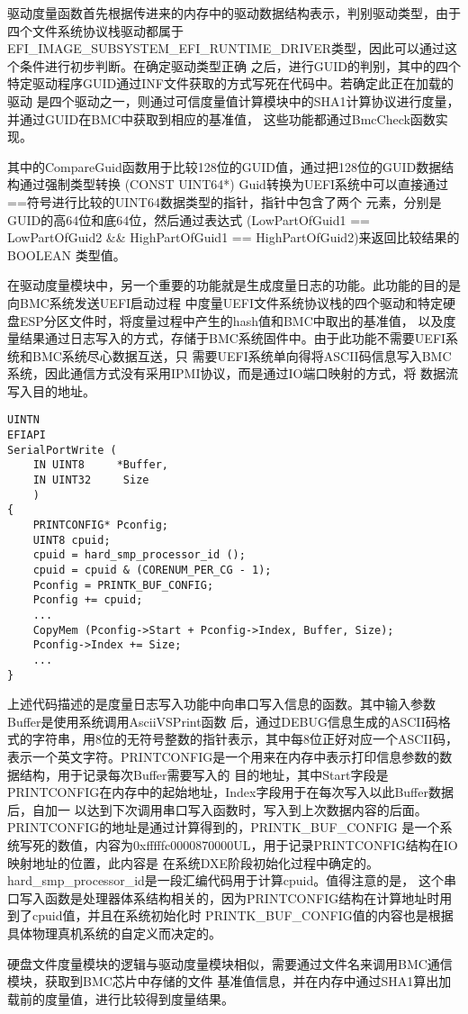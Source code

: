 驱动度量函数首先根据传进来的内存中的驱动数据结构表示，判别驱动类型，由于四个文件系统协议栈驱动都属于
EFI\_IMAGE\_SUBSYSTEM\_EFI\_RUNTIME\_DRIVER类型，因此可以通过这个条件进行初步判断。在确定驱动类型正确
之后，进行GUID的判别，其中的四个特定驱动程序GUID通过INF文件获取的方式写死在代码中。若确定此正在加载的驱动
是四个驱动之一，则通过可信度量值计算模块中的SHA1计算协议进行度量，并通过GUID在BMC中获取到相应的基准值，
这些功能都通过BmcCheck函数实现。
\par 其中的CompareGuid函数用于比较128位的GUID值，通过把128位的GUID数据结构通过强制类型转换
(CONST UINT64*) Guid转换为UEFI系统中可以直接通过==符号进行比较的UINT64数据类型的指针，指针中包含了两个
元素，分别是GUID的高64位和底64位，然后通过表达式
(LowPartOfGuid1 == LowPartOfGuid2 \&\& HighPartOfGuid1 == HighPartOfGuid2)来返回比较结果的BOOLEAN
类型值。
\par 在驱动度量模块中，另一个重要的功能就是生成度量日志的功能。此功能的目的是向BMC系统发送UEFI启动过程
中度量UEFI文件系统协议栈的四个驱动和特定硬盘ESP分区文件时，将度量过程中产生的hash值和BMC中取出的基准值，
以及度量结果通过日志写入的方式，存储于BMC系统固件中。由于此功能不需要UEFI系统和BMC系统尽心数据互送，只
需要UEFI系统单向得将ASCII码信息写入BMC系统，因此通信方式没有采用IPMI协议，而是通过IO端口映射的方式，将
数据流写入目的地址。

\begin{lstlisting}
UINTN
EFIAPI
SerialPortWrite (
    IN UINT8     *Buffer,
    IN UINT32     Size
    )
{
    PRINTCONFIG* Pconfig;
    UINT8 cpuid;
    cpuid = hard_smp_processor_id ();
    cpuid = cpuid & (CORENUM_PER_CG - 1);
    Pconfig = PRINTK_BUF_CONFIG;
    Pconfig += cpuid;
    ...
    CopyMem (Pconfig->Start + Pconfig->Index, Buffer, Size);
    Pconfig->Index += Size;
    ...
}
\end{lstlisting}
上述代码描述的是度量日志写入功能中向串口写入信息的函数。其中输入参数Buffer是使用系统调用AsciiVSPrint函数
后，通过DEBUG信息生成的ASCII码格式的字符串，用8位的无符号整数的指针表示，其中每8位正好对应一个ASCII码，
表示一个英文字符。PRINTCONFIG是一个用来在内存中表示打印信息参数的数据结构，用于记录每次Buffer需要写入的
目的地址，其中Start字段是PRINTCONFIG在内存中的起始地址，Index字段用于在每次写入以此Buffer数据后，自加一
以达到下次调用串口写入函数时，写入到上次数据内容的后面。PRINTCONFIG的地址是通过计算得到的，PRINTK\_BUF\_CONFIG
是一个系统写死的数值，内容为0xfffffc0000870000UL，用于记录PRINTCONFIG结构在IO映射地址的位置，此内容是
在系统DXE阶段初始化过程中确定的。hard\_smp\_processor\_id是一段汇编代码用于计算cpuid。值得注意的是，
这个串口写入函数是处理器体系结构相关的，因为PRINTCONFIG结构在计算地址时用到了cpuid值，并且在系统初始化时
PRINTK\_BUF\_CONFIG值的内容也是根据具体物理真机系统的自定义而决定的\cite{chinese13}。
\par 硬盘文件度量模块的逻辑与驱动度量模块相似，需要通过文件名来调用BMC通信模块，获取到BMC芯片中存储的文件
基准值信息，并在内存中通过SHA1算出加载前的度量值，进行比较得到度量结果。

